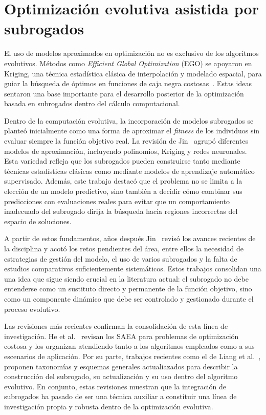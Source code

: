 \section{Optimización evolutiva asistida por subrogados}
\label{sec:estado_saea}

El uso de modelos aproximados en optimización no es exclusivo de los
algoritmos evolutivos. Métodos como \textit{Efficient Global
    Optimization} (EGO) se apoyaron en Kriging, una técnica estadística clásica de
interpolación y modelado espacial, para guiar la búsqueda de óptimos en
funciones de caja negra costosas~\cite{jones1998}. Estas ideas sentaron una
base importante para el desarrollo posterior de la optimización basada en
subrogados dentro del cálculo computacional.

Dentro de la computación evolutiva, la incorporación de modelos subrogados se
planteó inicialmente como una forma de aproximar el \textit{fitness} de los
individuos sin evaluar siempre la función objetivo real. La revisión de
Jin~\cite{jin2005} agrupó diferentes modelos de aproximación, incluyendo
polinomios, Kriging y redes neuronales. Esta variedad refleja que los
subrogados pueden construirse tanto mediante técnicas estadísticas clásicas
como mediante modelos de aprendizaje automático supervisado. Además, este trabajo
destacó que el problema no se limita a la elección de un modelo predictivo, sino
también a decidir cómo combinar sus predicciones con evaluaciones reales para evitar que un comportamiento inadecuado del subrogado dirija la búsqueda hacia regiones incorrectas del espacio de soluciones.

A partir de estos fundamentos, años después Jin~\cite{jin2011surrogate} revisó los avances recientes de la disciplina y acotó los retos pendientes del área, entre ellos la necesidad de estrategias de gestión del modelo, el uso de varios subrogados y la falta de estudios comparativos suficientemente sistemáticos. Estos trabajos consolidan una una idea que sigue siendo crucial en la literatura actual: el subrogado no debe entenderse como un sustituto directo y permanente de la función objetivo, sino como un componente dinámico que debe ser controlado y gestionado durante el proceso evolutivo.

Las revisiones más recientes confirman la consolidación de esta línea de
investigación. He et al.~\cite{he2023review} revisan los SAEA para problemas
de optimización costosa y los organizan atendiendo tanto a los algoritmos
empleados como a sus escenarios de aplicación. Por su parte, trabajos recientes como el de Liang et al.~\cite{liang2025survey}, proponen taxonomías y esquemas generales actualiazados para describir la construcción del subrogado, su actualización y su uso dentro del algoritmo evolutivo. En conjunto, estas revisiones muestran que la integración de subrogados ha pasado de ser una técnica auxiliar a constituir una línea de investigación propia y robusta dentro de la optimización evolutiva.

